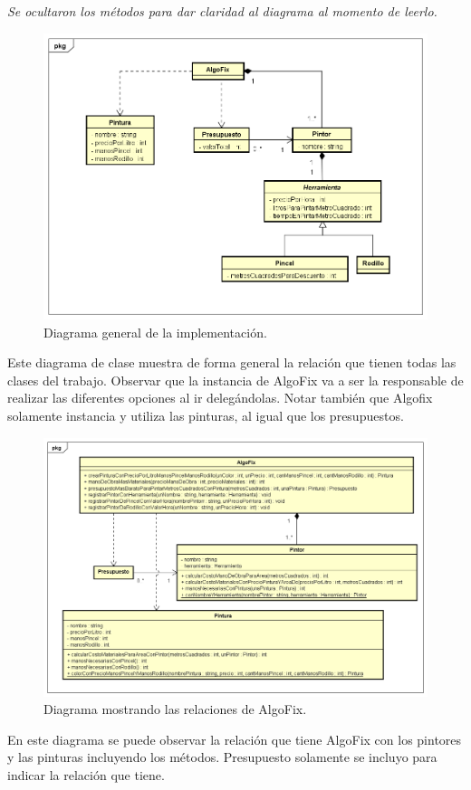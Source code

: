 \documentclass[titlepage,a4paper]{article}
\begin{document}
\textit{Se ocultaron los métodos para dar claridad al diagrama al momento de leerlo.}\\
\begin{figure}[H]
\centering
\includegraphics[width=1\textwidth]{Diagrama general.png}
\caption{\label{fig:class04}Diagrama general de la implementación.}
\end{figure}
\indent Este diagrama de clase muestra de forma general la relación que tienen todas las clases del trabajo. Observar que la instancia de AlgoFix va a ser la responsable de realizar las diferentes opciones al ir delegándolas. Notar también que Algofix solamente instancia y utiliza las pinturas, al igual que los presupuestos.

\newpage


\begin{figure}[H]
\centering
\includegraphics[width=1\textwidth]{AlgoFix.png}
\caption{\label{fig:class01}Diagrama mostrando las relaciones de AlgoFix.}
\end{figure}
En este diagrama se puede observar la relación que tiene AlgoFix con los pintores y las pinturas incluyendo los métodos. Presupuesto solamente se incluyo para indicar la relación que tiene.
\end{document}
